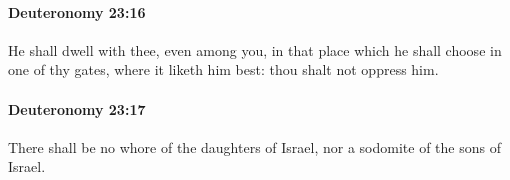 		\paragraph{Deuteronomy 23:16} %
			\label{DEUTERONOMY-23-16}

			He shall dwell with thee, even among you, in that place which he shall choose in one of thy gates, where it liketh him best: thou shalt not oppress him.


		\paragraph{Deuteronomy 23:17} %
			\label{DEUTERONOMY-23-17}

			There shall be no whore of the daughters of Israel, nor a sodomite of the sons of Israel.


